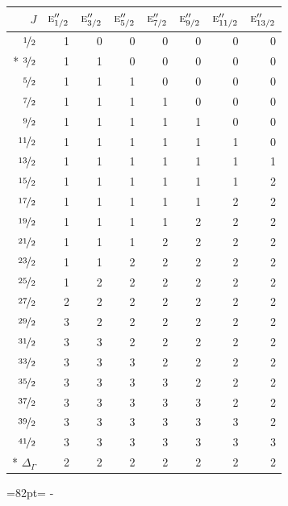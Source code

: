 \documentclass[10pt,a4paper]{article}
\makeatletter
\def\grouprule#1#2{\noalign{\marks\LTgroupmarks{\the\belowrulesep}\nobreak\vskip#1%
  \vskip\aboverulesep}\multispan\LT@cols\unskip{\leaders\hrule\@height#2\hfill\kern\z@}\cr
  \noalign{\penalty\LTrulebreak\vskip\belowrulesep\global\@lastruleclass\z@}}
\newcommand{\needspace}[1]{\par\penalty-100\begingroup\dimen0=#1\relax\dimen2=\pagegoal
  \advance\dimen2-\pagetotal\ifdim\dimen0>\dimen2\relax\ifdim\dimen2>0pt\vfil\break\fi\fi
  \endgroup}
\numberwithin{equation}{section}
\newcommand{\irr}[1]{\text{\normalfont\scshape #1}}
\makeatother
\begin{document}
{\small\begin{longtable}{@{}rrrrrrrr@{}}\toprule
$J$ & $\irr{e}_{1/2}''$ & $\irr{e}_{3/2}''$ & $\irr{e}_{5/2}''$ & $\irr{e}_{7/2}''$ & $\irr{e}_{9/2}''$ & $\irr{e}_{11/2}''$ & $\irr{e}_{13/2}''$\\\midrule\endhead
\bottomrule\endfoot\endlastfoot
$\nicefrac{1}{2}$ & 1 & 0 & 0 & 0 & 0 & 0 & 0\\*
$\nicefrac{3}{2}$ & 1 & 1 & 0 & 0 & 0 & 0 & 0\\
$\nicefrac{5}{2}$ & 1 & 1 & 1 & 0 & 0 & 0 & 0\\
$\nicefrac{7}{2}$ & 1 & 1 & 1 & 1 & 0 & 0 & 0\\
$\nicefrac{9}{2}$ & 1 & 1 & 1 & 1 & 1 & 0 & 0\\
$\nicefrac{11}{2}$ & 1 & 1 & 1 & 1 & 1 & 1 & 0\\
$\nicefrac{13}{2}$ & 1 & 1 & 1 & 1 & 1 & 1 & 1\\
$\nicefrac{15}{2}$ & 1 & 1 & 1 & 1 & 1 & 1 & 2\\
$\nicefrac{17}{2}$ & 1 & 1 & 1 & 1 & 1 & 2 & 2\\
$\nicefrac{19}{2}$ & 1 & 1 & 1 & 1 & 2 & 2 & 2\\
$\nicefrac{21}{2}$ & 1 & 1 & 1 & 2 & 2 & 2 & 2\\
$\nicefrac{23}{2}$ & 1 & 1 & 2 & 2 & 2 & 2 & 2\\
$\nicefrac{25}{2}$ & 1 & 2 & 2 & 2 & 2 & 2 & 2\\
$\nicefrac{27}{2}$ & 2 & 2 & 2 & 2 & 2 & 2 & 2\\
$\nicefrac{29}{2}$ & 3 & 2 & 2 & 2 & 2 & 2 & 2\\
$\nicefrac{31}{2}$ & 3 & 3 & 2 & 2 & 2 & 2 & 2\\
$\nicefrac{33}{2}$ & 3 & 3 & 3 & 2 & 2 & 2 & 2\\
$\nicefrac{35}{2}$ & 3 & 3 & 3 & 3 & 2 & 2 & 2\\
$\nicefrac{37}{2}$ & 3 & 3 & 3 & 3 & 3 & 2 & 2\\
$\nicefrac{39}{2}$ & 3 & 3 & 3 & 3 & 3 & 3 & 2\\
$\nicefrac{41}{2}$ & 3 & 3 & 3 & 3 & 3 & 3 & 3\\*
\grouprule{0pt}{\lightrulewidth} $\Delta_\Gamma$ & 2 & 2 & 2 & 2 & 2 & 2 & 2\\
\bottomrule\end{longtable}}
\needspace{82pt}
\end{document}
